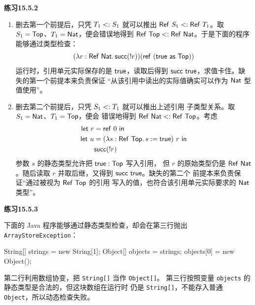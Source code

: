 \begin{taplsolutionentrybox}
\label{sol:translator:15.5.2}
\textbf{练习15.5.2}

\begin{enumerate}
\item 删去第一个前提后，只凭 \(T_1\mathrel{<:} S_1\) 就可以推出
  \(\tapltype{Ref}\ S_1\subtype\tapltype{Ref}\ T_1\)。取
  \(S_1=\mathsf{Top}\)、\(T_1=\mathsf{Nat}\)，便会错误地得到
  \(\tapltype{Ref}\ \tapltype{Top}\subtype
    \tapltype{Ref}\ \tapltype{Nat}\)。于是下面的程序能够通过类型检查：
  \[
  (\lambda r:\mathsf{Ref}\ \mathsf{Nat}.\,
     \mathsf{succ}(!r))
  (\mathsf{ref}\ (\mathsf{true}\ \mathsf{as}\ \mathsf{Top}))
  \]
  运行时，引用单元实际保存的是 \(\mathsf{true}\)，读取后得到
  \(\mathsf{succ}\ \tapltrue\)，求值卡住。缺失的第一个前提本来负责保证
  “从该引用中读出的实际值确实可以作为 \(\mathsf{Nat}\) 型值使用”。

\item 删去第二个前提后，只凭 \(S_1\mathrel{<:} T_1\) 就可以推出上述引用
  子类型关系。取 \(S_1=\mathsf{Nat}\)、\(T_1=\mathsf{Top}\)，便会
  错误地得到
  \(\mathsf{Ref}\ \mathsf{Nat}\mathrel{<:}
    \mathsf{Ref}\ \mathsf{Top}\)。考虑
  \[
  \begin{aligned}
  \mathsf{let}\ r&=\mathsf{ref}\ 0\ \mathsf{in}\\
  \mathsf{let}\ u&=(\lambda s:\mathsf{Ref}\ \mathsf{Top}.\,
                      s:=\mathsf{true})\ r\ \mathsf{in}\\
  &\mathsf{succ}(!r)
  \end{aligned}
  \]
  参数 \(s\) 的静态类型允许把 \(\mathsf{true}:\mathsf{Top}\) 写入引用，
  但 \(r\) 的原始类型仍是 \(\tapltype{Ref}\ \tapltype{Nat}\)。随后读取
  \(r\) 并取后继，又得到 \(\mathsf{succ}\ \tapltrue\)。缺失的第二个
  前提本来负责保证“通过被视为 \(\mathsf{Ref}\ \mathsf{Top}\) 的引用
  写入的值，也符合该引用单元实际要求的 \(\mathsf{Nat}\) 类型”。
\end{enumerate}

\end{taplsolutionentrybox}

\begin{taplsolutionentrybox}
\label{sol:translator:15.5.3}
\textbf{练习15.5.3}

下面的 Java 程序能够通过静态类型检查，却会在第三行抛出
\texttt{ArrayStoreException}：
\begin{tapljavacode}
String[] strings = new String[1];
Object[] objects = strings;
objects[0] = new Object();
\end{tapljavacode}
第二行利用数组协变，把 \texttt{String[]} 当作 \texttt{Object[]}。
第三行按照变量 \texttt{objects} 的静态类型是合法的，但这块数组在运行时
仍是 \texttt{String[]}，不能存入普通 \texttt{Object}，所以动态检查失败。

\end{taplsolutionentrybox}

